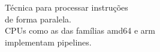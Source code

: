 \documentclass[preview]{standalone}
\begin{document}
Técnica para processar instruções\\de forma paralela.\\CPUs como as das famílias amd64 e arm\\ implementam pipelines.\\
\end{document}
